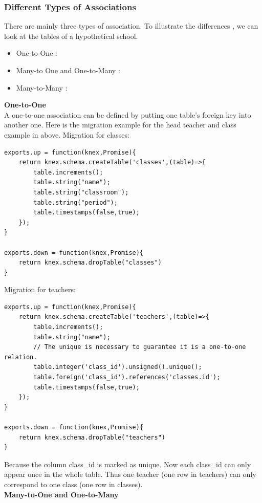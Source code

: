 \documentclass[a4paper]{article}
\begin{document}
\subsubsection{Different Types of Associations}
There are mainly three types of association. To illustrate the differences , we can look at the tables of a hypothetical school.\\
\begin{itemize}
\item One-to-One : 
\item Many-to One and One-to-Many : 
\item Many-to-Many : 
\end{itemize}

\textbf{One-to-One}\\

A one-to-one association can be defined by putting one table’s foreign key into another one. Here is the migration example for the head teacher and class example in above. Migration for classes:
\begin{lstlisting}
exports.up = function(knex,Promise){
    return knex.schema.createTable('classes',(table)=>{
        table.increments();
        table.string("name");
        table.string("classroom");
        table.string("period");
        table.timestamps(false,true);
    });
}

exports.down = function(knex,Promise){
    return knex.schema.dropTable("classes")
}
\end{lstlisting}
Migration for teachers:
\begin{lstlisting}
exports.up = function(knex,Promise){
    return knex.schema.createTable('teachers',(table)=>{
        table.increments();
        table.string("name");
        // The unique is necessary to guarantee it is a one-to-one relation.
        table.integer('class_id').unsigned().unique();
        table.foreign('class_id').references('classes.id');
        table.timestamps(false,true);
    });
}

exports.down = function(knex,Promise){
    return knex.schema.dropTable("teachers")
}
\end{lstlisting}
Because the column class\_id is marked as unique. Now each class\_id can only appear once in the whole table. Thus one teacher (one row in teachers) can only correspond to one class (one row in classes).\\

\textbf{Many-to-One and One-to-Many}\\
\end{document}
